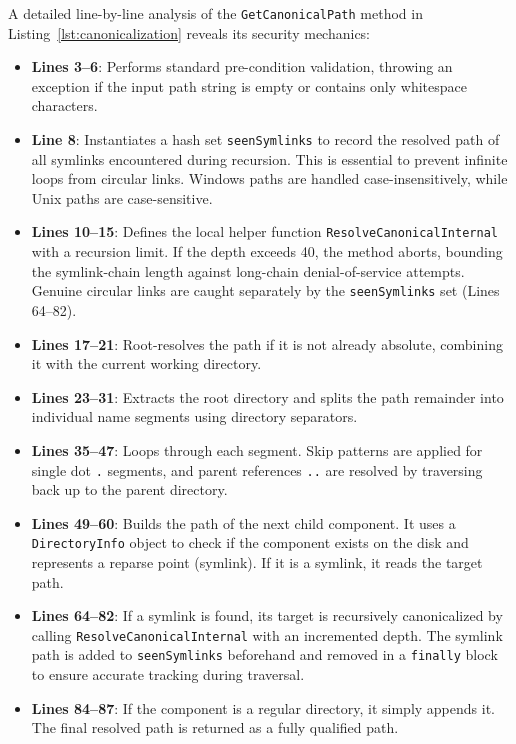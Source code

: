 A detailed line-by-line analysis of the \texttt{GetCanonicalPath} method in Listing~\ref{lst:canonicalization} reveals its security mechanics:
\begin{itemize}
    \item \textbf{Lines 3--6}: Performs standard pre-condition validation, throwing an exception if the input path string is empty or contains only whitespace characters.
    \item \textbf{Line 8}: Instantiates a hash set \texttt{seenSymlinks} to record the resolved path of all symlinks encountered during recursion. This is essential to prevent infinite loops from circular links. Windows paths are handled case-insensitively, while Unix paths are case-sensitive.
    \item \textbf{Lines 10--15}: Defines the local helper function \texttt{ResolveCanonicalInternal} with a recursion limit. If the depth exceeds 40, the method aborts, bounding the symlink-chain length against long-chain denial-of-service attempts. Genuine circular links are caught separately by the \texttt{seenSymlinks} set (Lines 64--82).
    \item \textbf{Lines 17--21}: Root-resolves the path if it is not already absolute, combining it with the current working directory.
    \item \textbf{Lines 23--31}: Extracts the root directory and splits the path remainder into individual name segments using directory separators.
    \item \textbf{Lines 35--47}: Loops through each segment. Skip patterns are applied for single dot \texttt{.} segments, and parent references \texttt{..} are resolved by traversing back up to the parent directory.
    \item \textbf{Lines 49--60}: Builds the path of the next child component. It uses a \texttt{Directory\-Info} object to check if the component exists on the disk and represents a reparse point (symlink). If it is a symlink, it reads the target path.
    \item \textbf{Lines 64--82}: If a symlink is found, its target is recursively canonicalized by calling \texttt{ResolveCanonicalInternal} with an incremented depth. The symlink path is added to \texttt{seenSymlinks} beforehand and removed in a \texttt{finally} block to ensure accurate tracking during traversal.
    \item \textbf{Lines 84--87}: If the component is a regular directory, it simply appends it. The final resolved path is returned as a fully qualified path.
\end{itemize}

